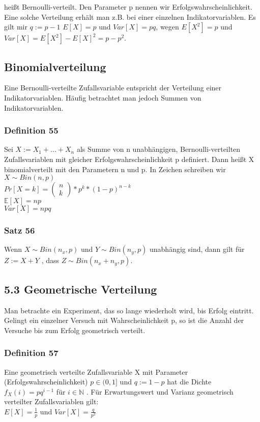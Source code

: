 \documentclass[11pt]{article}
\begin{document}
{heißt Bernoulli-verteilt. Den Parameter p nennen wir Erfolgswahrscheinlichkeit.
Eine solche Verteilung erhält man z.B. bei einer einzelnen Indikatorvariablen. Es gilt mir \(q := p-1\)
\(E[X] = p\) und \(Var[X] = pq\),
wegen \(E[X^2] = p\) und \(Var[X] = E[X^2] - E[X]^2 = p - p^2\).
\subsection{Binomialverteilung}
\label{sec:org6d8c9d4}
Eine Bernoulli-verteilte Zufallsvariable entspricht der Verteilung einer Indikatorvariablen. Häufig betrachtet man jedoch Summen von Indikatorvariablen.
\subsubsection{Definition 55}
\label{sec:orgf80529b}
Sei \(X := X_1 + ... + X_n\) als Summe von n unabhängigen, Bernoulli-verteilten Zufallsvariablen mit gleicher Erfolgswahrscheinlichkeit p definiert. Dann heißt X binomialverteilt mit den Parametern n und p. In Zeichen schreiben wir
\(X \sim Bin(n,p)\) \\
\(Pr[X=k] = \begin{pmatrix} n \\ k \end{pmatrix} * p^k * (1-p)^{n-k}\) \\
\(\mathbb{E}[X] = np\) \\
\(Var[X] = npq\)
\subsubsection{Satz 56}
\label{sec:orgf537bca}
Wenn \(X \sim Bin(n_x, p)\) und \(Y \sim Bin(n_y, p)\) unabhängig sind, dann gilt für \(Z := X + Y\) , dass \(Z \sim Bin(n_x + n_y, p)\).
\subsection{5.3 Geometrische Verteilung}
\label{sec:org51123c6}
Man betrachte ein Experiment, das so lange wiederholt wird, bis Erfolg eintritt. Gelingt ein einzelner Versuch mit Wahrscheinlichkeit p, so ist die Anzahl der Versuche bis zum Erfolg geometrisch verteilt.
\subsubsection{Definition 57}
\label{sec:orgfd06049}
Eine geometrisch verteilte Zufallsvariable X mit Parameter (Erfolgswahrscheinlichkeit)
\(p \in (0, 1]\) und \(q := 1 - p\) hat die Dichte
\(f_X(i) = pq^{i-1}\) für \(i \in \mathbb{N}\) .
Für Erwartungswert und Varianz geometrisch verteilter Zufallsvariablen gilt: \\
\(E[X] = \frac{1}{p}\) und \(Var[X] = \frac{q}{p^2}\)
}
\end{document}
